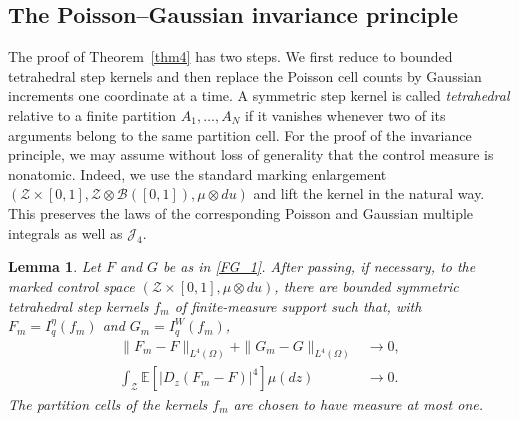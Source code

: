\documentclass[letterpaper,11pt,reqno]{amsart}
\numberwithin{equation}{section}
\theoremstyle{plain}
\newtheorem{lemma}[theorem]{Lemma}
\theoremstyle{definition}
\theoremstyle{remark}
\newcommand{\E}{\mathbb{E}}
\newcommand{\cZ}{\mathcal{Z}}
\newcommand{\sZ}{\mathscr{Z}}
\newcommand{\noi}{\noindent}
\newcommand{\dd}{d}
\newcommand{\Jfour}{\mathcal J_4}
\begin{document}
\subsection{The Poisson--Gaussian invariance principle}
\label{SEC_50}


The proof of Theorem~\ref{thm4} has two steps.  We first reduce to
bounded tetrahedral step kernels and then replace the Poisson cell
counts by Gaussian increments one coordinate at a time.  A symmetric
step kernel is called \emph{tetrahedral} relative to a finite partition
$A_1,\ldots,A_N$ if it vanishes whenever two of its arguments belong
to the same partition cell.
For the proof of the invariance principle, we may assume without loss
of generality that the control measure is nonatomic.  Indeed, we use
the standard marking enlargement
$(\cZ\times[0,1],\sZ\otimes\mathcal B([0,1]),\mu\otimes\dd u)$
and lift the kernel in the natural way.  This preserves the laws of
the corresponding Poisson and Gaussian multiple integrals as well as
$\Jfour$.

 

\begin{lemma}
\label{lem_tetra_core}
Let $F$ and $G$ be as in \eqref{FG_1}.  After passing,
if necessary, to the marked control space
$(\cZ\times[0,1],\mu\otimes\dd u)$, there are bounded symmetric
tetrahedral step kernels $f_m$ of finite-measure support such that,
with $F_m=I_q^\eta(f_m)$ and $G_m=I_q^W(f_m)$,
\noi
\begin{align}
 \|F_m-F\|_{L^4(\Omega)}
 +\|G_m-G\|_{L^4(\Omega)}
 &\longrightarrow0,
 \label{tetra_L4}\\
 \int_\cZ\E[|D_z(F_m-F)|^4]\mu(\dd z)
 &\longrightarrow0.
 \label{tetra_D4}
\end{align}
The partition cells of the kernels $f_m$ are chosen to have measure at most one.
\end{lemma}
\end{document}

